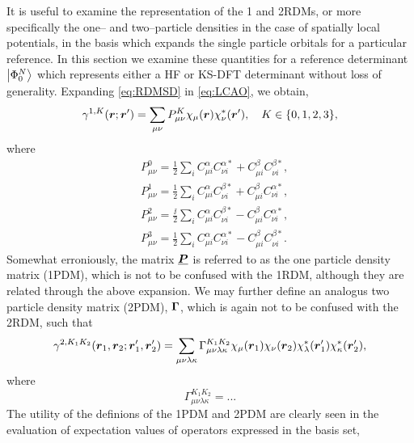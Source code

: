 It is useful to examine the representation of the 1 and 2RDMs, or more specifically the one-- and two--particle
densities in the case of spatially local potentials, in the basis which expands the single particle orbitals
for a particular reference. In this section we examine these quantities for a reference determinant $\left\vert \Phi_0^N \right\rangle$
which represents either a HF or KS-DFT determinant without loss of generality.  
Expanding \cref{eq:RDMSD} in \cref{eq:LCAO}, we obtain,
\begin{equation}
  \gamma^{1,K}(\boldsymbol{r}; \boldsymbol{r}') = \sum_{\mu\nu} P_{\mu\nu}^{K} \chi_\mu(\boldsymbol{r}) \chi^*_\nu(\boldsymbol{r}'), \quad K \in \{0,1,2,3\},
\end{equation}
where
\begin{subequations}
  \label{eq:1PDM}
\begin{align}
  &P^{0}_{\mu\nu} = \frac{1}{2}   \sum_i C_{\mu i}^\alpha C_{\nu i}^{\alpha *} + C_{\mu i}^\beta  C_{\nu i}^{\beta  *},\\
  &P^{1}_{\mu\nu} = \frac{1}{2}   \sum_i C_{\mu i}^\alpha C_{\nu i}^{\beta  *} + C_{\mu i}^\beta  C_{\nu i}^{\alpha *},\\
  &P^{2}_{\mu\nu} = \frac{\ii}{2} \sum_i C_{\mu i}^\alpha C_{\nu i}^{\beta  *} - C_{\mu i}^\beta  C_{\nu i}^{\alpha *},\\
  &P^{3}_{\mu\nu} = \frac{1}{2}   \sum_i C_{\mu i}^\alpha C_{\nu i}^{\alpha *} - C_{\mu i}^\beta  C_{\nu i}^{\beta  *}.
\end{align}
\end{subequations}
Somewhat erroniously, the matrix $\boldsymbol{\underline{P}}$ is referred to as the one particle density matrix (1PDM), which is not to be
confused with the 1RDM, although they are related through the above expansion. We may further define an analogus two
particle density matrix (2PDM), $\boldsymbol{\Gamma}$, which is again not to be confused with the 2RDM, such that 
\begin{equation}
  \gamma^{2,K_1K_2}(\boldsymbol{r}_1, \boldsymbol{r}_2; \boldsymbol{r}'_1, \boldsymbol{r}'_2) = 
    \sum_{\mu\nu\lambda\kappa} \Gamma^{K_1K_2}_{\mu\nu\lambda\kappa} 
      \chi_\mu(\boldsymbol{r}_1) \chi_\nu(\boldsymbol{r}_2) \chi^*_\lambda(\boldsymbol{r}'_1) \chi^*_\kappa(\boldsymbol{r}'_2), 
\end{equation}
where 
\begin{equation}
  \Gamma^{K_1 K_2}_{\mu\nu\lambda\kappa} = ...
\end{equation}
The utility of the definions of the 1PDM and 2PDM  are clearly seen in the evaluation of expectation values
of operators expressed in the basis set,
